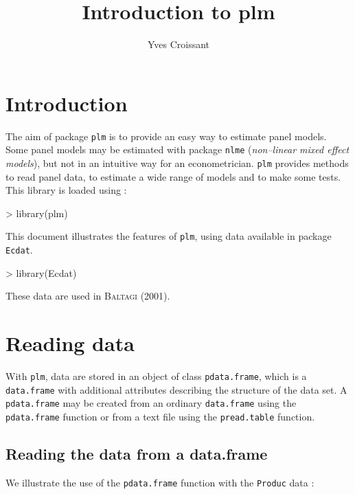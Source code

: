 \documentclass{article}
\title{Introduction to plm}
\author{Yves Croissant}
\begin{document}
\maketitle


\section{Introduction}

The aim of package \texttt{plm} is to provide an easy way to estimate
panel models. Some panel models may be estimated with package \texttt{nlme}
(\textit{non--linear mixed effect models}), but not in an intuitive
way for an econometrician.
\texttt{plm} provides methods to read panel data, to estimate a wide
range of models and to make some tests. 
This library is loaded using :

\begin{Schunk}
\begin{Sinput}
> library(plm)
\end{Sinput}
\end{Schunk}

This document illustrates the features  of  \texttt{plm}, using
data available in  package \texttt{Ecdat}. 

\begin{Schunk}
\begin{Sinput}
> library(Ecdat)
\end{Sinput}
\end{Schunk}

These data are used in  \textsc{Baltagi} (2001).

\section{Reading data}

With \texttt{plm}, data are stored in an object of class
\texttt{pdata.frame},  which is a \texttt{data.frame} with additional
attributes describing the structure of the data set.
A \texttt{pdata.frame} may be created from an ordinary \texttt{data.frame}
using the \texttt{pdata.frame} function or from a text file using the
\texttt{pread.table} function.


\subsection{Reading the data from a data.frame}

We illustrate the use of the \texttt{pdata.frame} function with the
\texttt{Produc} data :
\end{document}

